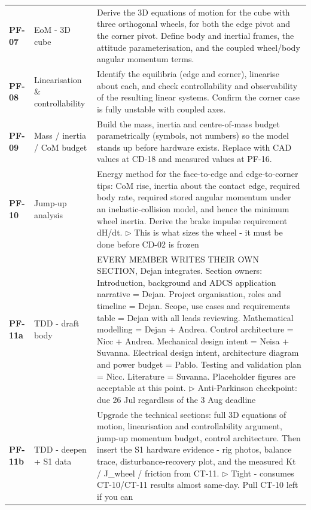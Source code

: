 {\begin{longtable}{@{}L{1.1cm} L{3.0cm} L{11.0cm}@{}}
\textbf{PF-07} & EoM - 3D cube & Derive the 3D equations of motion for the cube with three orthogonal wheels, for both the edge pivot and the corner pivot. Define body and inertial frames, the attitude parameterisation, and the coupled wheel/body angular momentum terms. \\[2pt]
\textbf{PF-08} & Linearisation \& controllability & Identify the equilibria (edge and corner), linearise about each, and check controllability and observability of the resulting linear systems. Confirm the corner case is fully unstable with coupled axes. \\[2pt]
\textbf{PF-09} & Mass / inertia / CoM budget & Build the mass, inertia and centre-of-mass budget parametrically (symbols, not numbers) so the model stands up before hardware exists. Replace with CAD values at CD-18 and measured values at PF-16. \\[2pt]
\textbf{PF-10} & Jump-up analysis & Energy method for the face-to-edge and edge-to-corner tips: CoM rise, inertia about the contact edge, required body rate, required stored angular momentum under an inelastic-collision model, and hence the minimum wheel inertia. Derive the brake impulse requirement dH/dt. \newline\textcolor{p0col}{\footnotesize$\triangleright$ This is what sizes the wheel - it must be done before CD-02 is frozen} \\[2pt]
\textbf{PF-11a} & TDD - draft body & EVERY MEMBER WRITES THEIR OWN SECTION, Dejan integrates. Section owners: Introduction, background and ADCS application narrative = Dejan. Project organisation, roles and timeline = Dejan. Scope, use cases and requirements table = Dejan with all leads reviewing. Mathematical modelling = Dejan + Andrea. Control architecture = Nicc + Andrea. Mechanical design intent = Neisa + Suvanna. Electrical design intent, architecture diagram and power budget = Pablo. Testing and validation plan = Nicc. Literature = Suvanna. Placeholder figures are acceptable at this point. \newline\textcolor{p0col}{\footnotesize$\triangleright$ Anti-Parkinson checkpoint: due 26 Jul regardless of the 3 Aug deadline} \\[2pt]
\textbf{PF-11b} & TDD - deepen + S1 data & Upgrade the technical sections: full 3D equations of motion, linearisation and controllability argument, jump-up momentum budget, control architecture. Then insert the S1 hardware evidence - rig photos, balance trace, disturbance-recovery plot, and the measured Kt / J\_wheel / friction from CT-11. \newline\textcolor{p0col}{\footnotesize$\triangleright$ Tight - consumes CT-10/CT-11 results almost same-day. Pull CT-10 left if you can} \\[2pt]

\end{longtable}}
